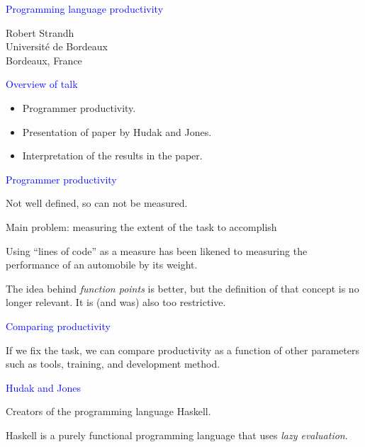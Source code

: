 \documentclass{slides}
\newcommand{\ti}[1]{\begin{center}\Large{\textcolor{blue}{#1}}\end{center}}
\begin{document}
\landscape
\setlength{\oddsidemargin}{1cm}
\setlength{\evensidemargin}{1cm}
\setlength{\marginparwidth}{1cm}
\setlength{\parskip}{0.5cm}
\setlength{\parindent}{0cm}
\begin{slide}\ti{Programming language productivity}
\vskip 0.5cm
\begin{center}
Robert Strandh \\
Université de Bordeaux \\
Bordeaux, France
\end{center}
\vfill\end{slide}
\begin{slide}\ti{Overview of talk}

  \begin{itemize}
  \item Programmer productivity.
  \item Presentation of paper by Hudak and Jones.
  \item Interpretation of the results in the paper.
  \end{itemize}

\vfill\end{slide}
\begin{slide}\ti{Programmer productivity}

Not well defined, so can not be measured.

Main problem: measuring the extent of the task to accomplish

Using ``lines of code'' as a measure has been likened to measuring the
performance of an automobile by its weight.

The idea behind \emph{function points} is better, but the definition
of that concept is no longer relevant.  It is (and was) also too
restrictive.

\vfill\end{slide}
\begin{slide}\ti{Comparing productivity}

If we fix the task, we can compare productivity as a function of other
parameters such as tools, training, and development method.

\vfill\end{slide}
\begin{slide}\ti{Hudak and Jones}

Creators of the programming language Haskell.

Haskell is a purely functional programming language that uses
\emph{lazy evaluation}.

\vfill\end{slide}
\end{document}
